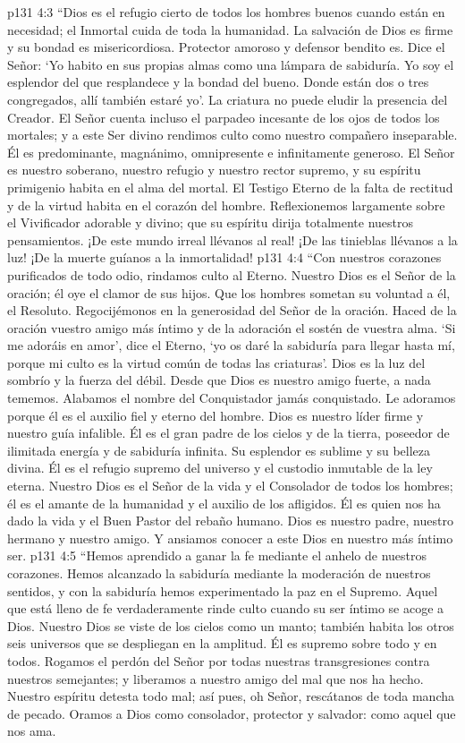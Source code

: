 \vs p131 4:3 “Dios es el refugio cierto de todos los hombres buenos cuando están en necesidad; el Inmortal cuida de toda la humanidad. La salvación de Dios es firme y su bondad es misericordiosa. Protector amoroso y defensor bendito es. Dice el Señor: ‘Yo habito en sus propias almas como una lámpara de sabiduría. Yo soy el esplendor del que resplandece y la bondad del bueno. Donde están dos o tres congregados, allí también estaré yo'. La criatura no puede eludir la presencia del Creador. El Señor cuenta incluso el parpadeo incesante de los ojos de todos los mortales; y a este Ser divino rendimos culto como nuestro compañero inseparable. Él es predominante, magnánimo, omnipresente e infinitamente generoso. El Señor es nuestro soberano, nuestro refugio y nuestro rector supremo, y su espíritu primigenio habita en el alma del mortal. El Testigo Eterno de la falta de rectitud y de la virtud habita en el corazón del hombre. Reflexionemos largamente sobre el Vivificador adorable y divino; que su espíritu dirija totalmente nuestros pensamientos. ¡De este mundo irreal llévanos al real! ¡De las tinieblas llévanos a la luz! ¡De la muerte guíanos a la inmortalidad!
\vs p131 4:4 “Con nuestros corazones purificados de todo odio, rindamos culto al Eterno. Nuestro Dios es el Señor de la oración; él oye el clamor de sus hijos. Que los hombres sometan su voluntad a él, el Resoluto. Regocijémonos en la generosidad del Señor de la oración. Haced de la oración vuestro amigo más íntimo y de la adoración el sostén de vuestra alma. ‘Si me adoráis en amor', dice el Eterno, ‘yo os daré la sabiduría para llegar hasta mí, porque mi culto es la virtud común de todas las criaturas'. Dios es la luz del sombrío y la fuerza del débil. Desde que Dios es nuestro amigo fuerte, a nada tememos. Alabamos el nombre del Conquistador jamás conquistado. Le adoramos porque él es el auxilio fiel y eterno del hombre. Dios es nuestro líder firme y nuestro guía infalible. Él es el gran padre de los cielos y de la tierra, poseedor de ilimitada energía y de sabiduría infinita. Su esplendor es sublime y su belleza divina. Él es el refugio supremo del universo y el custodio inmutable de la ley eterna. Nuestro Dios es el Señor de la vida y el Consolador de todos los hombres; él es el amante de la humanidad y el auxilio de los afligidos. Él es quien nos ha dado la vida y el Buen Pastor del rebaño humano. Dios es nuestro padre, nuestro hermano y nuestro amigo. Y ansiamos conocer a este Dios en nuestro más íntimo ser.
\vs p131 4:5 “Hemos aprendido a ganar la fe mediante el anhelo de nuestros corazones. Hemos alcanzado la sabiduría mediante la moderación de nuestros sentidos, y con la sabiduría hemos experimentado la paz en el Supremo. Aquel que está lleno de fe verdaderamente rinde culto cuando su ser íntimo se acoge a Dios. Nuestro Dios se viste de los cielos como un manto; también habita los otros seis universos que se despliegan en la amplitud. Él es supremo sobre todo y en todos. Rogamos el perdón del Señor por todas nuestras transgresiones contra nuestros semejantes; y liberamos a nuestro amigo del mal que nos ha hecho. Nuestro espíritu detesta todo mal; así pues, oh Señor, rescátanos de toda mancha de pecado. Oramos a Dios como consolador, protector y salvador: como aquel que nos ama.
